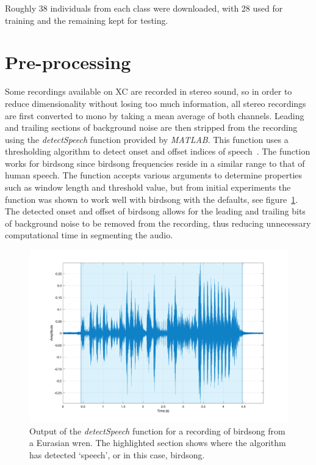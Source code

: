 Roughly 38 individuals from each class were downloaded, with 28 used for
training and the remaining kept for testing.

\section{Pre-processing}

Some recordings available on XC are recorded in stereo sound, so in order to
reduce dimensionality without losing too much information, all stereo recordings
are first converted to mono by taking a mean average of both channels. Leading
and trailing sections of background noise are then stripped from the recording
using the \textit{detectSpeech} function provided by \textit{MATLAB}. This
function uses a thresholding algorithm to detect onset and offset indices of
speech~\cite{giannakopoulos2009method}. The function works for birdsong since
birdsong frequencies reside in a similar range to that of human speech. The
function accepts various arguments to determine properties such as window length
and threshold value, but from initial experiments the function was shown to
work well with birdsong with the defaults, see figure~\ref{fig:detected_speech}.
The detected onset and offset of birdsong allows for the leading and trailing
bits of background noise to be removed from the recording, thus reducing
unnecessary computational time in segmenting the audio.

\begin{figure}[ht]
  \centering
  \includegraphics[width=\textwidth]{figures/detected_speech.png}
  \caption{Output of the \textit{detectSpeech} function for a recording of
  birdsong from a Eurasian wren. The highlighted section shows where the
algorithm has detected `speech', or in this case,
birdsong.}\label{fig:detected_speech}
\end{figure}

